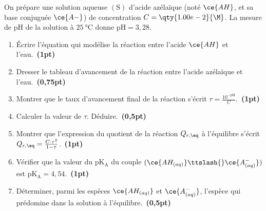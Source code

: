 On prépare une solution aqueuse $\mathrm{(S)}$ d'acide azélaïque (noté
$\ce{AH}$, et sa base conjuguée $\ce{A-}$) de concentration
$C=\qty{1.00e-2}{\M}$. La mesure de $\mathrm{pH}$ de la solution à
$\qty{25}{\degreeCelsius}$ donne $\mathrm{pH}=3,28$.

\begin{enumerate}
    \item Écrire l'équation qui modélise la réaction entre l'acide $\ce{AH}$ et
          l'eau.~\textbf{(1pt)}
    \item Dresser le tableau d'avancement de la réaction entre l'acide azélaïque
          et l'eau.~\textbf{(0,75pt)}
    \item Montrer que le taux d'avancement final de la réaction s'écrit
          $\tau=\frac{10^{-\mathrm{pH}}}{C}$.~\textbf{(1pt)}
    \item Calculer la valeur de $\tau$. Déduire.~\textbf{(0,5pt)}
    \item Montrer que l'expression du quotient de la réaction $Q_{r,\eq}$ à
          l'équilibre s'écrit
          $Q_{r,\eq}=\frac{C\cdot\tau^{2}}{1-\tau}$.~\textbf{(1pt)}
    \item Vérifier que la valeur du $\mathrm{pK_{A}}$ du couple
          $(\ce{AH_{(aq)}}\ttslash{}\ce{A^-_{(aq)}})$ est
          $\mathrm{pK_{A}}=4,54$.~\textbf{(1pt)}
    \item Déterminer, parmi les espèces $\ce{AH_{(aq)}}$ et $\ce{A^-_{(aq)}}$,
          l'espèce qui prédomine dans la solution à
          l'équilibre.~\textbf{(0,5pt)}
\end{enumerate}

